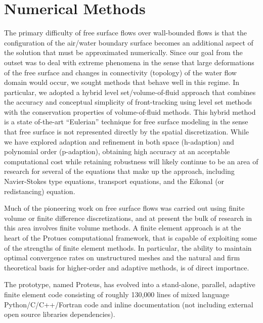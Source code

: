\documentclass[letterpaper,12pt,english]{sphinxmanual}
\begin{document}
\chapter{Numerical Methods}
\label{index:wavetank-documentation-of-proteus-mprans-draft}\label{index:numerics-sec}\label{index:numerical-methods}\label{index:intro-sec}
The primary difficulty of free surface flows over wall-bounded flows is that the configuration of the air/water boundary surface becomes an additional aspect of the solution that must be approximated numerically. Since our goal from the outset was to deal with extreme phenomena in the sense that large deformations of the free surface and changes in connectivity (topology) of the water flow domain would occur, we sought methods that behave well in this regime. In particular, we adopted a hybrid level set/volume-of-fluid approach that combines the accuracy and conceptual simplicity of front-tracking using level set methods with the conservation properties of volume-of-fluid methods. This hybrid method is a state of-the-art “Eulerian” technique for free surface modeling in the sense that free surface is not represented directly by the spatial discretization. While we have explored adaption and refinement in both space (h-adaption) and polynomial order (p-adaption), obtaining high accuracy at an acceptable computational cost while retaining robustness will likely continue to be an area of research for several of the equations that make up the approach, including Navier-Stokes type equations, transport equations, and the Eikonal (or redistancing) equation.

Much of the pioneering work on free surface flows was carried out using finite volume or finite difference discretizations, and at present the bulk of research in this area involves finite volume methods. A finite element approach is at the heart of the Protues computational framework, that is capable of exploiting some of the strengths of finite element methods. In particular, the ability to maintain optimal convergence rates on unstructured meshes and the natural and firm theoretical basis for higher-order and adaptive methods, is of direct importnce.

The prototype, named Proteus, has evolved into a stand-alone, parallel, adaptive finite element code consisting of roughly 130,000 lines of mixed language Python/C/C++/Fortran code and inline documentation (not including external open source libraries dependencies).
\end{document}
